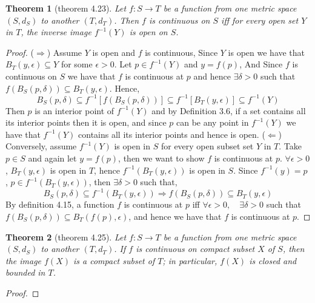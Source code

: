 \documentclass[aps,pra,notitlepage,amsmath,amssymb,letterpaper,12pt]{revtex4-1}
\newtheorem{theorem}{Theorem}
\begin{document}
\begin{theorem}[theorem 4.23]
Let $f:S \to T$  be a function from one metric space $(S,d_{S})$ to another $(T,d_{T})$. Then $f$ is continuous on $S$ iff for every open set $Y$ in $T$, the inverse image $f^{-1}(Y)$ is open on $S$.
\end{theorem}
\begin{proof}
($\Longrightarrow$) Assume $Y$ is open and $f$ is continuous, Since $Y$ is open we have that $B_{T}(y,\epsilon) \subseteq Y$ for some $\epsilon > 0$. Let $p \in f^{-1}(Y)$ and $y=f(p)$, And Since $f$ is continuous on $S$ we have that $f$ is continuous at $p$ and hence $\exists \delta > 0$ such that  $f(B_{S}(p,\delta)) \subseteq B_{T}(y,\epsilon)$. Hence,
\[B_{S}(p,\delta) \subseteq f^{-1}[f(B_{S}(p,\delta))] \subseteq f^{-1}[B_{T}(y,\epsilon)] \subseteq f^{-1}(Y)\]
Then $p$ is an interior point of $f^{-1}(Y)$ and by Definition 3.6, if a set contains all its interior points then it is open, and since $p$ can be any point in $f^{-1}(Y)$ we have that $f^{-1}(Y)$ contains all its interior points and hence is open.
\newline{}
($\Longleftarrow$) Conversely, assume $f^{-1}(Y)$ is open in $S$ for every open subset set $Y$ in $T$. Take $p \in S$ and again let $y=f(p)$, then we want to show $f$ is continuous at $p$. $\forall \epsilon > 0$, $B_{T}(y,\epsilon)$ is open in $T$, hence $f^{-1}(B_{T}(y,\epsilon))$ is open in $S$. Since $f^{-1}(y) = p$ ,  $p \in f^{-1}(B_{T}(y,\epsilon))$, then $\exists \delta > 0$ such that,
\[B_{S}(p,\delta) \subseteq f^{-1}(B_{T}(y,\epsilon)) \Rightarrow f(B_{S}(p,\delta)) \subseteq B_{T}(y,\epsilon)\]
By definition 4.15, a function $f$ is continuous at $p$ iff $\forall \epsilon > 0, \quad \exists \delta > 0$ such that $ f(B_{S}(p,\delta)) \subseteq B_{T}(f(p),\epsilon)$, and hence we have that $f$ is continuous at $p$.
\end{proof}

\begin{theorem}[theorem 4.25]
Let $f:S \to T$  be a function from one metric space $(S,d_{S})$ to another $(T,d_{T})$. If $f$ is continuous on compact subset $X$ of $S$, then the image $f(X)$ is a compact subset of $T$; in particular, $f(X)$ is closed and bounded in $T$.
\end{theorem}
\begin{proof}
\end{proof}
\end{document}

